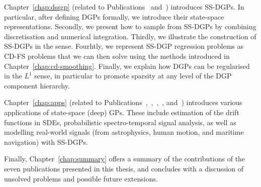 Chapter~\ref{chap:dssgp} (related to Publications~ and~) introduces SS-DGPs. In particular, after defining DGPs formally, we introduce their state-space representations. Secondly, we present how to sample from SS-DGPs by combining discretisation and numerical integration. Thirdly, we illustrate the construction of SS-DGPs in the \matern sense. Fourhtly, we represent SS-DGP regression problems as CD-FS problems that we can then solve using the methods introduced in Chapter~\ref{chap:cd-smoothing}. Finally, we explain how DGPs can be regularised in the $L^1$ sense, in particular to promote sparsity at any level of the DGP component hierarchy.

Chapter~\ref{chap:apps} (related to Publications~,~,~,~, and~) introduces various applications of state-space (deep) GPs. These include estimation of the drift functions in SDEs, probabilistic spectro-temporal signal analysis, as well as modelling real-world signals (from astrophysics, human motion, and maritime navigation) with SS-DGPs.

Finally, Chapter~\ref{chap:summary} offers a summary of the contributions of the seven publications presented in this thesis, and concludes with a discussion of unsolved problems and possible future extensions. 
